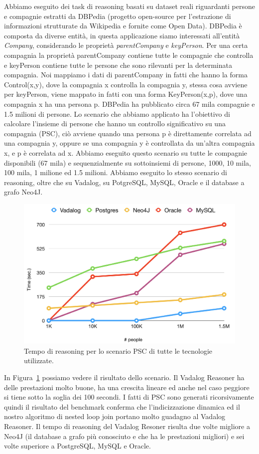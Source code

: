 Abbiamo eseguito dei task di reasoning basati su dataset reali riguardanti persone e compagnie estratti da DBPedia (progetto open-source per l'estrazione di informazioni strutturate da Wikipedia e fornite come Open Data). \newline
DBPedia è composta da diverse entità, in questa applicazione siamo interessati all'entità \emph{Company}, considerando le proprietà \emph{parentCompany} e \emph{keyPerson}. Per una certa compagnia la proprietà parentCompany contiene tutte le compagnie che controlla e keyPerson contiene tutte le persone che sono rilevanti per la determinata compagnia. \newline
Noi mappiamo i dati di parentCompany in fatti che hanno la forma Control(x,y), dove la compagnia x controlla la compagnia y, stessa cosa avviene per keyPerson, viene mappato in fatti con una forma KeyPerson(x,p), dove una compagnia x ha una persona p. DBPedia ha pubblicato circa 67 mila compagnie e 1.5 milioni di persone. \newline
Lo scenario che abbiamo applicato ha l'obiettivo di calcolare l'insieme di persone che hanno un controllo significativo su una compagnia (PSC), ciò avviene quando una persona p è direttamente correlata ad una compagnia y, oppure se una compagnia y è controllata da un'altra compagnia x, e p è correlata ad x. \newline
Abbiamo eseguito questo scenario su tutte le compagnie disponibili (67 mila) e sequenzialmente su sottoinsiemi di persone, 1000, 10 mila, 100 mila, 1 milione ed 1.5 milioni. Abbiamo eseguito lo stesso scenario di reasoning, oltre che su Vadalog, su PotgreSQL, MySQL, Oracle e il database a grafo Neo4J. 
\begin{figure}[h]
	\centering
	\includegraphics[width=0.8\linewidth]{figure/dbpediaRisultato}
	\caption{Tempo di reasoning per lo scenario PSC di tutte le tecnologie utilizzate.}
	\label{fig:dbpediaRisultato}
\end{figure}

In Figura~\ref{fig:dbpediaRisultato} possiamo vedere il risultato dello scenario. Il Vadalog Reasoner ha delle prestazioni molto buone, ha una crescita lineare ed anche nel caso peggiore si tiene sotto la soglia dei 100 secondi. I fatti di PSC sono generati ricorsivamente quindi il risultato del benchmark conferma che l'indicizzazione dinamica ed il nostro algoritmo di nested loop join portano molto guadagno al Vadalog Reasoner. Il tempo di reasoning del Vadalog Resoner risulta due volte migliore a Neo4J (il database a grafo più conosciuto e che ha le prestazioni migliori) e sei volte superiore a PostgreSQL, MySQL e Oracle.
